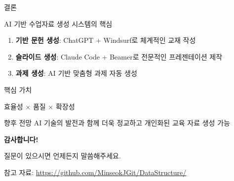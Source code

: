 \documentclass[aspectratio=169,xcolor=dvipsnames]{beamer}
\begin{document}



\begin{frame}{결론}
  \begin{block}{AI 기반 수업자료 생성 시스템의 핵심}
    \begin{enumerate}
      \item \textbf{기반 문헌 생성}: ChatGPT + Windsurf로 체계적인 교재 작성
      \item \textbf{슬라이드 생성}: Claude Code + Beamer로 전문적인 프레젠테이션 제작
      \item \textbf{과제 생성}: AI 기반 맞춤형 과제 자동 생성
    \end{enumerate}
  \end{block}

  \vspace{0.5cm}

  \begin{exampleblock}{핵심 가치}
    \begin{center}
      \Large
      효율성 $\times$ 품질 $\times$ 확장성
    \end{center}
  \end{exampleblock}

  \vspace{0.3cm}

  \begin{alertblock}{향후 전망}
    AI 기술의 발전과 함께 더욱 정교하고 개인화된 교육 자료 생성 가능
  \end{alertblock}
\end{frame}

\begin{frame}[plain]
  \centering
  \Huge \textbf{감사합니다!}

  \vspace{1cm}
  \normalsize
  질문이 있으시면 언제든지 말씀해주세요.\\\vspace{1em}
  
  참고 자료: \href{https://github.com/MinseokJGit/DataStructure/tree/main}{https://github.com/MinseokJGit/DataStructure/}
\end{frame}
\end{document}

